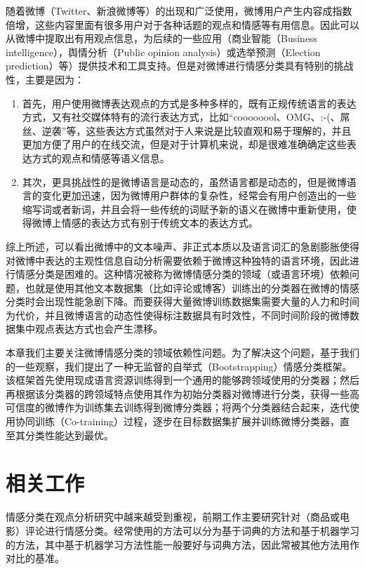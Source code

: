 随着微博（Twitter、新浪微博等）的出现和广泛使用，微博用户产生内容成指数倍增，这些内容里面有很多用户对于各种话题的观点和情感等有用信息。因此可以从微博中提取出有用观点信息，为后续的一些应用（商业智能（Business intelligence），舆情分析（Public opinion analysis）或选举预测（Election prediction）等）提供技术和工具支持。但是对微博进行情感分类具有特别的挑战性，主要是因为：
\begin{enumerate}
\item 首先，用户使用微博表达观点的方式是多种多样的，既有正规传统语言的表达方式，又有社交媒体特有的流行表达方式，比如“coooooool、OMG、:-(、屌丝、逆袭”等，这些表达方式虽然对于人来说是比较直观和易于理解的，并且更加方便了用户的在线交流，但是对于计算机来说，却是很难准确确定这些表达方式的观点和情感等语义信息。
\item 其次，更具挑战性的是微博语言是动态的，虽然语言都是动态的，但是微博语言的变化更加迅速，因为微博用户群体的复杂性，经常会有用户创造出的一些缩写词或者新词，并且会将一些传统的词赋予新的语义在微博中重新使用，使得微博上情感的表达方式有别于传统文本的表达方式。
\end{enumerate}

综上所述，可以看出微博中的文本噪声、非正式本质以及语言词汇的急剧膨胀使得对微博中表达的主观性信息自动分析需要依赖于微博这种独特的语言环境，因此进行情感分类是困难的。这种情况被称为微博情感分类的领域（或语言环境）依赖问题，也就是使用其他文本数据集（比如评论或博客）训练出的分类器在微博的情感分类时会出现性能急剧下降。而要获得大量微博训练数据集需要大量的人力和时间为代价，并且微博语言的动态性使得标注数据具有时效性，不同时间阶段的微博数据集中观点表达方式也会产生漂移。

本章我们主要关注微博情感分类的领域依赖性问题。为了解决这个问题，基于我们的一些观察，我们提出了一种无监督的自举式（Bootstrapping）情感分类框架。该框架首先使用现成语言资源训练得到一个通用的能够跨领域使用的分类器；然后再根据该分类器的跨领域特点使用其作为初始分类器对微博进行分类，获得一些高可信度的微博作为训练集去训练得到微博分类器；将两个分类器结合起来，迭代使用协同训练（Co-training）过程，逐步在目标数据集扩展并训练微博分类器，直至其分类性能达到最优。

\section{相关工作}
\label{ch4_relt}
情感分类在观点分析研究中越来越受到重视，前期工作主要研究针对（商品或电影）评论进行情感分类。经常使用的方法可以分为基于词典的方法和基于机器学习的方法，其中基于机器学习方法性能一般要好与词典方法，因此常被其他方法用作对比的基准。

